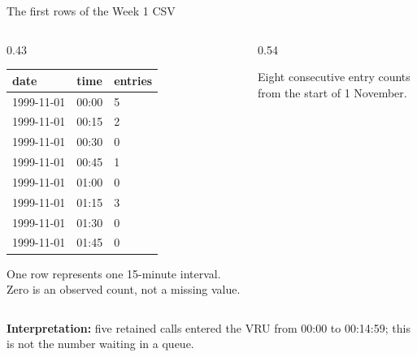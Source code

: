 \documentclass{beamer}
\begin{document}
\begin{frame}{The first rows of the Week 1 CSV}
  \begin{columns}[T,onlytextwidth]
    \begin{column}{0.43\textwidth}
      \scriptsize
      \begin{tabular}{@{}lll@{}}
        \textbf{date} & \textbf{time} & \textbf{entries} \\
        \hline
        1999-11-01 & 00:00 & 5 \\
        1999-11-01 & 00:15 & 2 \\
        1999-11-01 & 00:30 & 0 \\
        1999-11-01 & 00:45 & 1 \\
        1999-11-01 & 01:00 & 0 \\
        1999-11-01 & 01:15 & 3 \\
        1999-11-01 & 01:30 & 0 \\
        1999-11-01 & 01:45 & 0 \\
      \end{tabular}
      \vspace{0.6em}

      \normalsize One row represents one 15-minute interval. Zero is an observed count, not a missing value.
    \end{column}
    \begin{column}{0.54\textwidth}
      \centering
      \vspace{0.4em}

      \small Eight consecutive entry counts from the start of 1 November.
    \end{column}
  \end{columns}

  \vspace{0.7em}
  \textbf{Interpretation:} five retained calls entered the VRU from 00:00 to 00:14:59; this is not the number waiting in a queue.
\end{frame}
\end{document}
